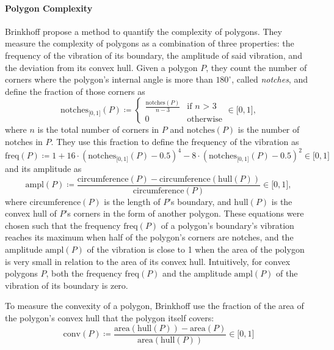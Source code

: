 \paragraph{Polygon Complexity}

Brinkhoff \etal{} \cite{brinkhoff1995measuring} propose a method to quantify the complexity of polygons.
They measure the complexity of polygons as a combination of three properties: the frequency of the vibration of its boundary, the amplitude of said vibration, and the deviation from its convex hull.
Given a polygon $P$, they count the number of corners where the polygon's internal angle is more than $180^\circ$, called \emph{notches}, and define the fraction of those corners as
%
\begin{equation*}
\text{notches}_{\lbrack0,1\rbrack}(P) \coloneqq
\begin{cases}
\frac{\text{notches}(P)}{n - 3} & \text{if $n$ > 3}\\
0 & \text{otherwise}
\end{cases}
\in \lbrack0,1\rbrack
,
\end{equation*}
%
where $n$ is the total number of corners in $P$ and $\text{notches}(P)$ is the number of notches in $P$.
They use this fraction to define the frequency of the vibration as
%
\begin{equation*}
\text{freq}(P) \coloneqq 1
+ 16 \cdot (\text{notches}_{\lbrack0,1\rbrack}(P) - 0.5)^4
- 8 \cdot (\text{notches}_{\lbrack0,1\rbrack}(P) - 0.5)^2
\in \lbrack0,1\rbrack
\end{equation*}
%
and its amplitude as
\begin{equation*}
\text{ampl}(P) \coloneqq
\frac{\text{circumference}(P) - \text{circumference}(\text{hull}(P))}{\text{circumference}(P)}
\in \lbrack0,1\rbrack
,
\end{equation*}
%
where $\text{circumference}(P)$ is the length of $P$'s boundary, and $\text{hull}(P)$ is the convex hull of $P$'s corners in the form of another polygon.
These equations were chosen such that the frequency $\text{freq}(P)$ of a polygon's boundary's vibration reaches its maximum when half of the polygon's corners are notches, and the amplitude $\text{ampl}(P)$ of the vibration is close to 1 when the area of the polygon is very small in relation to the area of its convex hull.
Intuitively, for convex polygons $P$, both the frequency $\text{freq}(P)$ and the amplitude $\text{ampl}(P)$ of the vibration of its boundary is zero.

To measure the convexity of a polygon, Brinkhoff \etal{} use the fraction of the area of the polygon's convex hull that the polygon itself covers:
%
\begin{equation*}
\text{conv}(P) \coloneqq
\frac{\text{area}(\text{hull}(P)) - \text{area}(P)}{\text{area}(\text{hull}(P))}
\in \lbrack0,1\rbrack
\end{equation*}

